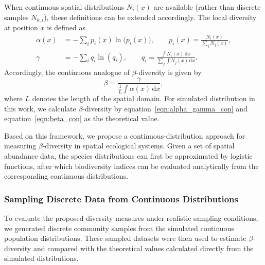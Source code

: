     When continuous spatial distributions $N_i(x)$ are available (rather than discrete samples $N_{k,i}$), these definitions can be extended accordingly. The local diversity at position $x$ is defined as
    \begin{equation}\label{eqn:alpha_gamma_con}
        \begin{aligned}
            \alpha(x) &= -\sum_i p_i(x) \ln\big(p_i(x)\big), 
            \qquad p_i(x) = \frac{N_i(x)}{\sum_{j} N_j(x)},\\
            \gamma &= -\sum_i q_i \ln(q_i),
            \qquad q_i = \frac{\int N_i(x)\,\mathrm{d}x}{\sum_{j} \int N_j(x)\,\mathrm{d}x}.
        \end{aligned}
    \end{equation}
    Accordingly, the continuous analogue of $\beta$-diversity is given by
    \begin{equation}\label{eqn:beta_con}
        \beta = \frac{\gamma}{\frac{1}{L} \int \alpha(x)\,\mathrm{d}x},
    \end{equation}
    where $L$ denotes the length of the spatial domain. For simulated distribution in this work, we calculate $\beta$-diversity by equation~\ref{eqn:alpha_gamma_con} and equation~\ref{eqn:beta_con} as the theoretical value.

    Based on this framework, we propose a continuous-distribution approach for measuring $\beta$-diversity in spatial ecological systems. Given a set of spatial abundance data, the species distributions can first be approximated by logistic functions, after which biodiversity indices can be evaluated analytically from the corresponding continuous distributions.


    \subsubsection*{Sampling Discrete Data from Continuous Distributions}

    To evaluate the proposed diversity measures under realistic sampling conditions, we generated discrete community samples from the simulated continuous population distributions. These sampled datasets were then used to estimate $\beta$-diversity and compared with the theoretical values calculated directly from the simulated distributions.

